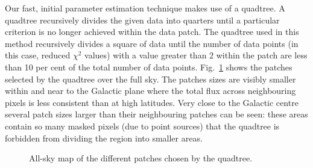 \documentclass[a4paper,fleqn,usenatbib]{mnras}
\begin{document}
Our fast, initial parameter estimation technique makes use of a quadtree. A quadtree recursively divides the given data into quarters until a particular criterion is no longer achieved within the data patch. The quadtree used in this method recursively divides a square of data until the number of data points (in this case, reduced $\chi^{2}$ values) with a value greater than 2 within the patch are less than 10 per cent of the total number of data points. Fig.~\ref{fig:patches} shows the patches selected by the quadtree over the full sky. The patches sizes are visibly smaller within and near to the Galactic plane where the total flux across neighbouring pixels is less consistent than at high latitudes. Very close to the Galactic centre several patch sizes larger than their neighbouring patches can be seen: these areas contain so many masked pixels (due to point sources) that the quadtree is forbidden from dividing the region into smaller areas. 

\begin{figure}
\centering
{}
\caption{All-sky map of the different patches chosen by the quadtree.}
\label{fig:patches}
\end{figure}
\end{document}
